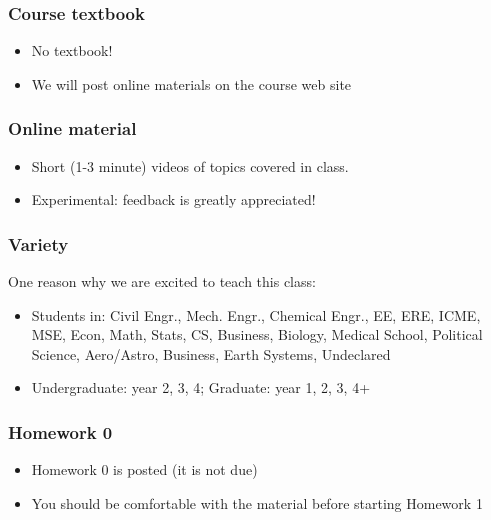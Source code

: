 \documentclass{beamer}
\begin{document}
\begin{frame}
\frametitle{Course textbook}

\begin{itemize}
\setlength{\itemsep}{0.2in}
\item{No textbook!}
\item{We will post online materials on the course web site}
\end{itemize}

\end{frame}

\begin{frame}
\frametitle{Online material}

\begin{itemize}
\setlength{\itemsep}{0.2in}
\item{Short (1-3 minute) videos of topics covered in class.}
\item{Experimental: feedback is greatly appreciated!}
\end{itemize}

\end{frame}


\begin{frame}
\frametitle{Variety}
One reason why we are excited to teach this class:

\begin{itemize}
\item{Students in: Civil Engr., Mech. Engr., Chemical Engr., EE, ERE, ICME, MSE, Econ, Math, Stats, CS, Business, Biology, Medical School, Political Science, Aero/Astro, Business, Earth Systems, Undeclared}
\item{Undergraduate: year 2, 3, 4; Graduate: year 1, 2, 3, 4+}
\end{itemize}

\end{frame}






\begin{frame}
\frametitle{Homework 0}

\begin{itemize}
\setlength{\itemsep}{0.2in}
\item{Homework 0 is posted (it is not due)}
\item{You should be comfortable with the material before starting Homework 1}
\end{itemize}

\end{frame}
\end{document}
